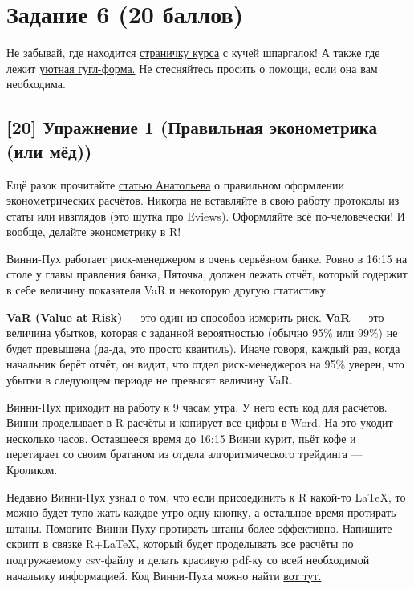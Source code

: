 \documentclass[12pt, a4paper, oneside]{article}
\begin{document}
\section*{Задание 6 (20 баллов)  }

Не забывай, где находится  \href{https://fulyankin.github.io/LaTeX/}{страничку курса} с кучей шпаргалок! А также где лежит \href{https://docs.google.com/forms/d/e/1FAIpQLSe11kxKVfv07iCL1E9yNX7ll9swKImiVwRr1H70lslGzInRSg/viewform}{уютная гугл-форма.} Не стесняйтесь просить о помощи, если она вам необходима. 

\subsection*{[20]   Упражнение 1 (Правильная эконометрика (или мёд)) }

Ещё разок прочитайте \href{https://github.com/FUlyankin/LaTeX/raw/master/Logi_2018/sem_5/Anatolyev.pdf}{статью Анатольева} о правильном оформлении эконометрических расчётов. Никогда не вставляйте в свою работу протоколы из статы или ивзглядов (это шутка про Eviews). Оформляйте всё по-человечески!  И вообще, делайте эконометрику в R!

Винни-Пух работает риск-менеджером в очень серьёзном банке. Ровно в 16:15 на столе у главы правления банка, Пяточка, должен лежать отчёт, который содержит в себе величину показателя VaR и некоторую другую статистику.

\textbf{VaR (Value at Risk)}  --- это один из способов измерить риск. \textbf{VaR} --- это величина убытков, которая с заданной вероятностью (обычно 95\% или 99\%) не будет превышена (да-да, это просто квантиль). Иначе говоря, каждый раз, когда начальник берёт отчёт, он видит, что отдел риск-менеджеров на 95\% уверен, что убытки в следующем периоде не превысят величину VaR.

Винни-Пух приходит на работу к 9 часам утра. У него есть код для расчётов. Винни проделывает в R расчёты и копирует все цифры в Word. На это уходит несколько часов. Оставшееся время до 16:15 Винни курит, пьёт кофе и перетирает со своим братаном из отдела алгоритмического трейдинга --- Кроликом.

Недавно Винни-Пух узнал о том, что если присоединить к R какой-то \LaTeX{}, то можно будет тупо жать каждое утро одну кнопку, а остальное время протирать штаны. Помогите Винни-Пуху протирать штаны более эффективно. Напишите скрипт в связке R+\LaTeX{}, который будет проделывать все расчёты по подгружаемому csv-файлу и делать красивую pdf-ку со всей необходимой начальику информацией.  Код Винни-Пуха можно найти \href{https://github.com/FUlyankin/LaTeX/blob/master/Logi_2018/Homework_2018/hw_5_script.R}{вот тут.}
\end{document}

